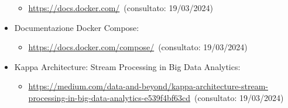 \begin{itemize}
\begin{itemize}
        \item \url{https://docs.docker.com/}~(consultato: 19/03/2024)
    \end{itemize}
    \item Documentazione Docker Compose: 
    \begin{itemize}
        \item \url{https://docs.docker.com/compose/}~(consultato: 19/03/2024)
    \end{itemize}
    \item Kappa Architecture: Stream Processing in Big Data Analytics: 
    \begin{itemize}
        \item \url{https://medium.com/data-and-beyond/kappa-architecture-stream-processing-in-big-data-analytics-e539f4bf63cd}~(consultato: 19/03/2024)
    \end{itemize}
\end{itemize}
